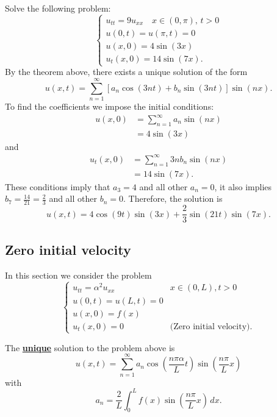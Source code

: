 \documentclass[12pt, a4paper]{article}
\begin{document}
\begin{mdexample}
    Solve the following problem:
    \[\begin{cases}
        u_{tt}=9u_{xx} \quad x \in (0,\pi), \, t>0 \\
        u(0,t)=u(\pi,t)=0 \\
        u(x,0)=4\sin(3x) \\
        u_t(x,0)=14\sin(7x).
    \end{cases}\]
    By the theorem above, there exists a unique solution of the form 
    \[u(x,t) = \sum_{n=1}^{\infty} \left[ a_n \cos(3nt)+b_n \sin(3nt) \right]\sin(nx).\]
    To find the coefficients we impose the initial conditions:
    \[\begin{aligned}
        u(x,0) &= \sum_{n=1}^{\infty} a_n \sin(nx) \\
        &= 4\sin(3x)
    \end{aligned}\]
    and 
    \[\begin{aligned}
        u_t(x,0) &= \sum_{n=1}^{\infty} 3n b_n \sin(nx) \\
        &= 14\sin(7x).
    \end{aligned}\]
    These conditions imply that \(a_3=4\) and all other \(a_n=0\), it also implies \(b_7 = \frac{14}{21} =\frac{2}{3}\) and all other \(b_n=0\). Therefore, the solution is 
    \[u(x,t) = 4\cos(9t)\sin(3x)+\frac{2}{3}\sin(21t)\sin(7x).\]
\end{mdexample}

\subsection{Zero initial velocity}

In this section we consider the problem 
\[\begin{cases}
    u_{tt} = \alpha^2 u_{xx} & x\in(0,L), t>0 \\
    u(0,t)=u(L,t)=0 \\
    u(x,0)=f(x) \\
    u_t(x,0)=0 & \text{(Zero initial velocity)}.
\end{cases}\]

\begin{mdthm}
    The \underline{\textbf{unique}} solution to the problem above is 
    \[u(x,t) = \sum_{n=1}^{\infty} a_n \cos\left( \frac{n\pi \alpha}{L}t \right)\sin\left( \frac{n\pi}{L}x \right)\] 
    with 
    \[a_n = \frac{2}{L} \int_{0}^L f(x) \sin \left( \frac{n\pi}{L}x \right) \, dx.\]
\end{mdthm}
\end{document}
